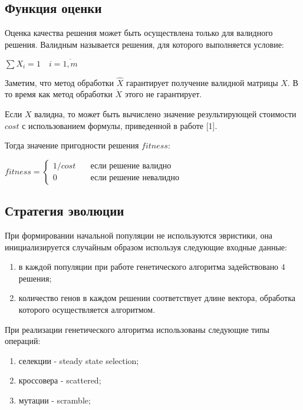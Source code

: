 \subsection*{Функция оценки}
Оценка качества решения может быть осуществлена только для валидного решения. Валидным называется решения, для которого выполняется условие:
\begin{center}
  $\displaystyle \sum X_{i} = 1 \quad i=\overline{1, m}$
\end{center}

Заметим, что метод обработки $\hat{X}$ гарантирует получение валидной матрицы $X$. В то время как метод обработки $\dot{X}$ этого не гарантирует.

Если $X$ валидна, то может быть вычислено значение результирующей стоимости $cost$ с использованием формулы, приведенной в работе [1].

Тогда значение пригодности решения $fitness$:
\begin{center}
  $
  \displaystyle fitness =
  \begin{cases}
    1 / cost & \quad \text{если решение валидно} \\
    0 & \quad \text{если решение невалидно}
  \end{cases}
  $
\end{center}

\subsection*{Стратегия эволюции}
При формировании начальной популяции не используются эвристики, она инициализируется случайным образом используя следующие входные данные:
\begin{enumerate}
  \item в каждой популяции при работе генетического алгоритма задействовано $4$ решения;
  \item количество генов в каждом решении соответствует длине вектора, обработка которого осуществляется алгоритмом.
\end{enumerate}

При реализации генетического алгоритма использованы следующие типы операций:
\begin{enumerate}
  \item селекции - steady state selection;
  \item кроссовера - scattered;
  \item мутации - scramble;
\end{enumerate}

